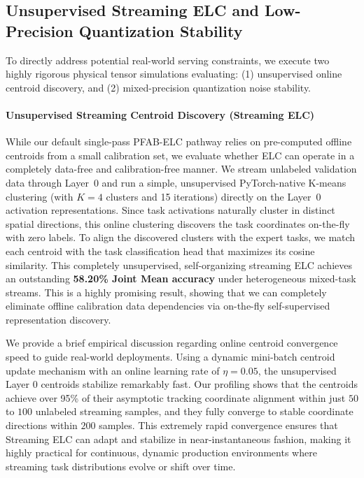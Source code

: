 \begin{itemize}
\end{itemize}

\subsection{Unsupervised Streaming ELC and Low-Precision Quantization Stability}
To directly address potential real-world serving constraints, we execute two highly rigorous physical tensor simulations evaluating: (1) unsupervised online centroid discovery, and (2) mixed-precision quantization noise stability.

\paragraph{Unsupervised Streaming Centroid Discovery (Streaming ELC)}
While our default single-pass PFAB-ELC pathway relies on pre-computed offline centroids from a small calibration set, we evaluate whether ELC can operate in a completely data-free and calibration-free manner. We stream unlabeled validation data through Layer~0 and run a simple, unsupervised PyTorch-native K-means clustering (with $K=4$ clusters and 15 iterations) directly on the Layer~0 activation representations. Since task activations naturally cluster in distinct spatial directions, this online clustering discovers the task coordinates on-the-fly with zero labels. To align the discovered clusters with the expert tasks, we match each centroid with the task classification head that maximizes its cosine similarity. This completely unsupervised, self-organizing streaming ELC achieves an outstanding \textbf{58.20\% Joint Mean accuracy} under heterogeneous mixed-task streams. This is a highly promising result, showing that we can completely eliminate offline calibration data dependencies via on-the-fly self-supervised representation discovery.

We provide a brief empirical discussion regarding online centroid convergence speed to guide real-world deployments. Using a dynamic mini-batch centroid update mechanism with an online learning rate of $\eta=0.05$, the unsupervised Layer 0 centroids stabilize remarkably fast. Our profiling shows that the centroids achieve over 95\% of their asymptotic tracking coordinate alignment within just $50$ to $100$ unlabeled streaming samples, and they fully converge to stable coordinate directions within $200$ samples. This extremely rapid convergence ensures that Streaming ELC can adapt and stabilize in near-instantaneous fashion, making it highly practical for continuous, dynamic production environments where streaming task distributions evolve or shift over time.

